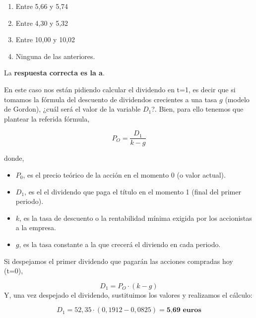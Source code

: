 \documentclass[
  letterpaper,
  DIV=11,
  numbers=noendperiod]{scrreprt}
\begin{document}
\begin{enumerate}
\def\labelenumi{\alph{enumi}.}
\item
  Entre 5,66 y 5,74
\item
  Entre 4,30 y 5,32
\item
  Entre 10,00 y 10,02
\item
  Ninguna de las anteriores.
\end{enumerate}

\begin{tcolorbox}[enhanced jigsaw, left=2mm, opacityback=0, colback=white, breakable, arc=.35mm, bottomrule=.15mm, rightrule=.15mm, toprule=.15mm, leftrule=.75mm, colframe=quarto-callout-tip-color-frame]
\begin{minipage}[t]{5.5mm}
\textcolor{quarto-callout-tip-color}{\faLightbulb}
\end{minipage}%
\begin{minipage}[t]{\textwidth - 5.5mm}

La \textbf{respuesta correcta es la a}.

En este caso nos están pidiendo calcular el dividendo en t=1, es decir
que si tomamos la fórmula del descuento de dividendos crecientes a una
tasa \(g\) (modelo de Gordon), ¿cuál será el valor de la variable
\(D_1\)?. Bien, para ello tenemos que plantear la referida fórmula,

\[P_O=\frac{D_1}{k-g}\]

donde,

\begin{itemize}
\item
  \(P_0\), es el precio teórico de la acción en el momento 0 (o valor
  actual).
\item
  \(D_1\), es el el dividendo que paga el título en el momento 1 (final
  del primer periodo).
\item
  \(k\), es la tasa de descuento o la rentabilidad mínima exigida por
  los accionistas a la empresa.
\item
  \(g\), es la tasa constante a la que crecerá el diviendo en cada
  periodo.
\end{itemize}

Si despejamos el primer dividendo que pagarán las acciones compradas hoy
(t=0),

\[D_1={P_O}\cdot ({k-g})\] Y, una vez despejado el dividendo,
sustituimos los valores y realizamos el cálculo:

\[D_1={52,35}\cdot({0,1912-0,0825})=\textbf{5,69 euros}\]

\end{minipage}%
\end{tcolorbox}
\end{document}
